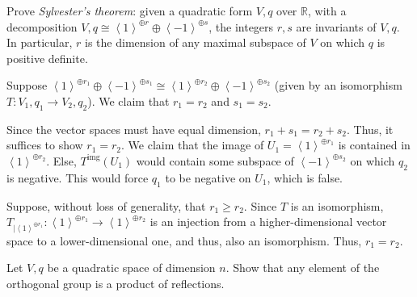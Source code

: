\documentclass[12 pt, letterpaper]{hmcpset}
\begin{document}
\begin{problem}[(1)]
	Prove \emph{Sylvester's theorem}: given a quadratic form $V, q$ over $\mathbb{R}$, with a decomposition $V, q \cong \left < 1 \right >^{\oplus r} \oplus \left < -1 \right >^{\oplus s}$, the integers $r, s$ are invariants of $V, q$. In particular, $r$ is the dimension of any maximal subspace of $V$ on which $q$ is positive definite.
\end{problem}

\begin{solution}
	Suppose $\left < 1 \right >^{\oplus r_{1}} \oplus \left < -1 \right >^{\oplus s_{1}} \cong \left < 1 \right >^{\oplus r_{2}} \oplus \left < -1 \right >^{\oplus s_{2}}$ (given by an isomorphism $T : V_{1}, q_{1} \to V_{2}, q_{2}$). We claim that $r_{1} = r_{2}$ and $s_{1} = s_{2}$.

	Since the vector spaces must have equal dimension, $r_{1} + s_{1} = r_{2} + s_{2}$. Thus, it suffices to show $r_{1} = r_{2}$. We claim that the image of $U_{1} = \left < 1 \right >^{\oplus r_{1}}$ is contained in $\left < 1 \right >^{\oplus r_{2}}$. Else, $T^{\text{img}}(U_{1})$ would contain some subspace of $\left < -1 \right >^{\oplus s_{2}}$ on which $q_{2}$ is negative. This would force $q_{1}$ to be negative on $U_{1}$, which is false. 

	Suppose, without loss of generality, that $r_{1} \ge r_{2}$. Since $T$ is an isomorphism, $T_{\mid \left < 1 \right >^{\oplus r_{1}}} : \left < 1 \right >^{\oplus r_{1}} \to \left < 1 \right >^{\oplus r_{2}}$ is an injection from a higher-dimensional vector space to a lower-dimensional one, and thus, also an isomorphism. Thus, $r_{1} = r_{2}$.
\end{solution}

\pagebreak

\begin{problem}[(2)]
	Let $V, q$ be a quadratic space of dimension $n$. Show that any element of the orthogonal group is a product of reflections.
\end{problem}
\end{document}
